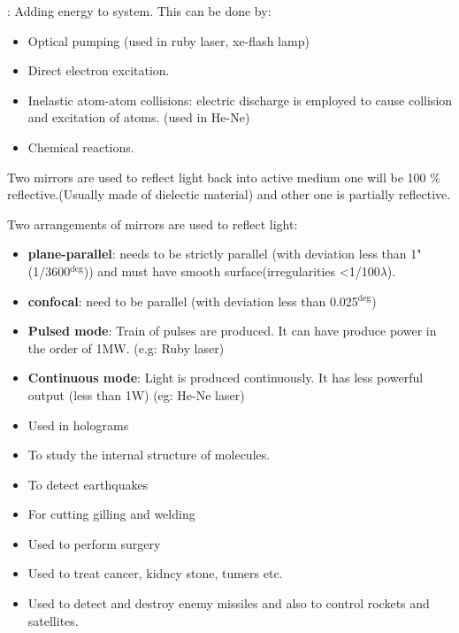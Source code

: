 \documentclass[12pt, a4paper]{article}
\begin{document}
: Adding energy to system. This can be done by:
\begin{itemize}
	\item Optical pumping (used in ruby laser, xe-flash lamp)
	\item Direct electron excitation.
	\item Inelastic atom-atom collisions: electric discharge is employed to cause collision and excitation of atoms. (used in He-Ne)
	\item Chemical reactions.

\end{itemize}


Two mirrors are used to reflect light back into active medium one will be 100 \% reflective.(Usually made of dielectic material) and other one is partially reflective.

Two arrangements of mirrors are used to reflect light:
\begin{itemize}
	\item \textbf{plane-parallel}: needs to be strictly parallel (with deviation less than 1" (1/3600$^{\deg}$)) and must have smooth surface(irregularities <1/100$\lambda$).
	\item \textbf{confocal}: need to be parallel (with deviation less than 0.025$^{\deg}$)
\end{itemize}



\begin{itemize}
	\item \textbf{Pulsed mode}: Train of pulses are produced. It can have produce power in the order of 1MW. (e.g: Ruby laser)
	\item \textbf{Continuous mode}: Light is produced continuously. It has less powerful output (less than 1W) (eg: He-Ne laser)
\end{itemize}


\begin{itemize}
	\item Used in holograms
	\item To study the internal structure of molecules.
	\item To detect earthquakes
	\item For cutting gilling and welding
	\item Used to perform surgery
	\item Used to treat cancer, kidncy stone, tumers etc.
	\item Used to detect and destroy enemy missiles and also to control rockets and satellites.
\end{itemize}
\end{document}
